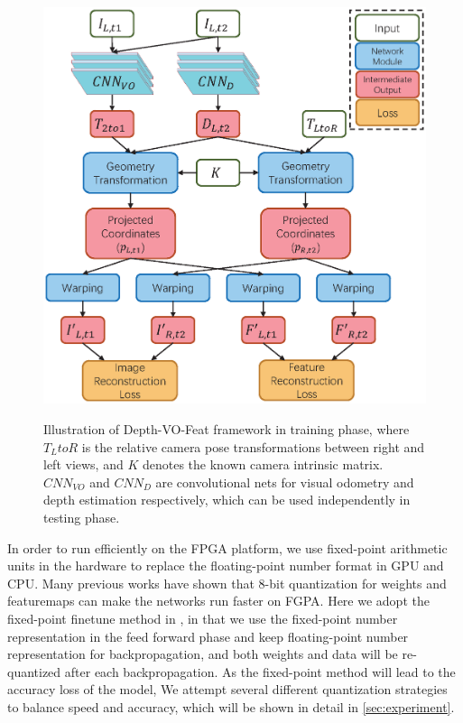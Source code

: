 \begin{figure}[thb]  
    \centering  
    {\includegraphics[width=0.95\linewidth]{fig/depth_vo_feat.eps}\label{fig:dvo}}
    \caption{Illustration of Depth-VO-Feat framework in training phase, where $T_LtoR$ is the relative camera pose transformations between right and left views, and $K$ denotes the known camera intrinsic matrix. $CNN_{VO}$ and $CNN_D$ are convolutional nets for visual odometry and depth estimation respectively, which can be used independently in testing phase. }
\end{figure}

In order to run efficiently on the FPGA platform, we use fixed-point arithmetic units in the hardware to replace the floating-point number format in GPU and CPU. Many previous works have shown that 8-bit quantization for weights and featuremaps can make the networks run faster on FGPA. Here we adopt the fixed-point finetune method in \cite{Yu:2018:IDC:3299999.3283452}, in that we use the fixed-point number representation in the feed forward phase and keep floating-point number representation for backpropagation, and both weights and data will be re-quantized after each backpropagation. As the fixed-point method will lead to the accuracy loss of the model, We attempt several different quantization strategies to balance speed and accuracy, which will be shown in detail in \cref{sec:experiment}.

